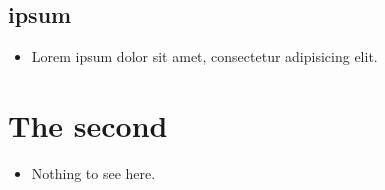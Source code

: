 \section{ipsum}  %
\label{autosec:5}
    \begin{itemize}[noitemsep]
        \item Lorem ipsum dolor sit amet, consectetur adipisicing elit.  %
    \end{itemize}
\chapter{The second}  %
\label{autosec:6}
    \begin{itemize}[noitemsep]
        \item Nothing to see here.  %
    \end{itemize}

